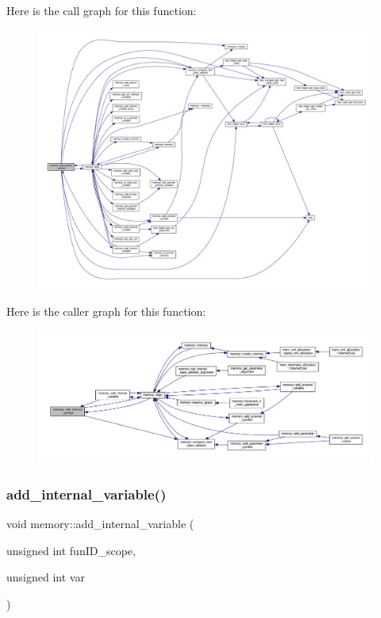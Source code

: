 Here is the call graph for this function\+:
\nopagebreak
\begin{figure}[H]
\begin{center}
\leavevmode
\includegraphics[width=350pt]{d8/d99/classmemory_ae4d01a6e84a8701b3b04432f3c173212_cgraph}
\end{center}
\end{figure}
Here is the caller graph for this function\+:
\nopagebreak
\begin{figure}[H]
\begin{center}
\leavevmode
\includegraphics[width=350pt]{d8/d99/classmemory_ae4d01a6e84a8701b3b04432f3c173212_icgraph}
\end{center}
\end{figure}
\mbox{\label{classmemory_a492d9004bff7ff81122a6bb4c2cc6b2d}} 
\subsubsection{\texorpdfstring{add\+\_\+internal\+\_\+variable()}{add\_internal\_variable()}}
{\footnotesize\ttfamily void memory\+::add\+\_\+internal\+\_\+variable (\begin{DoxyParamCaption}\item[{unsigned int}]{fun\+I\+D\+\_\+scope,  }\item[{unsigned int}]{var }\end{DoxyParamCaption})}



